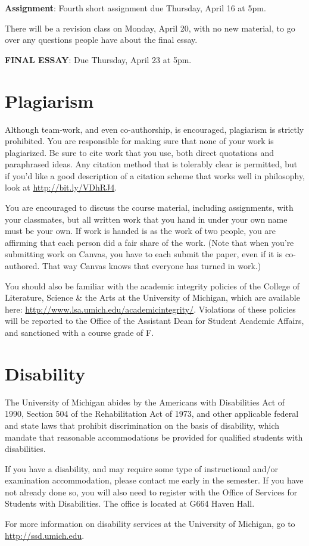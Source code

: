 \documentclass[
  letterpaper,
  DIV=11,
  numbers=noendperiod]{scrartcl}
\newcounter{none} %
\begin{document}
\textbf{Assignment}: Fourth short assignment due Thursday, April 16 at
5pm.

There will be a revision class on Monday, April 20, with no new
material, to go over any questions people have about the final essay.

\textbf{FINAL ESSAY}: Due Thursday, April 23 at 5pm.

\newpage

\section{Plagiarism}\label{plagiarism}

Although team-work, and even co-authorship, is encouraged, plagiarism is
strictly prohibited. You are responsible for making sure that none of
your work is plagiarized. Be sure to cite work that you use, both direct
quotations and paraphrased ideas. Any citation method that is tolerably
clear is permitted, but if you'd like a good description of a citation
scheme that works well in philosophy, look at
\url{http://bit.ly/VDhRJ4}.

You are encouraged to discuss the course material, including
assignments, with your classmates, but all written work that you hand in
under your own name must be your own. If work is handed is as the work
of two people, you are affirming that each person did a fair share of
the work. (Note that when you're submitting work on Canvas, you have to
each submit the paper, even if it is co-authored. That way Canvas knows
that everyone has turned in work.)

You should also be familiar with the academic integrity policies of the
College of Literature, Science \& the Arts at the University of
Michigan, which are available here:
\url{http://www.lsa.umich.edu/academicintegrity/}. Violations of these
policies will be reported to the Office of the Assistant Dean for
Student Academic Affairs, and sanctioned with a course grade of F.

\section{Disability}\label{disability}

The University of Michigan abides by the Americans with Disabilities Act
of 1990, Section 504 of the Rehabilitation Act of 1973, and other
applicable federal and state laws that prohibit discrimination on the
basis of disability, which mandate that reasonable accommodations be
provided for qualified students with disabilities.

If you have a disability, and may require some type of instructional
and/or examination accommodation, please contact me early in the
semester. If you have not already done so, you will also need to
register with the Office of Services for Students with Disabilities. The
office is located at G664 Haven Hall.

For more information on disability services at the University of
Michigan, go to \url{http://ssd.umich.edu}.
\end{document}
